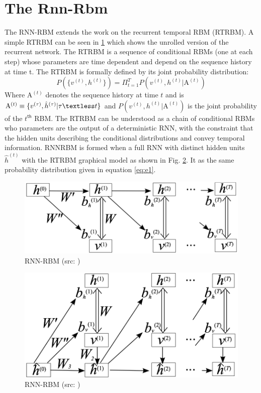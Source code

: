 \documentclass[letterpaper, 10 pt, conference]{ieeeconf}
\begin{document}
\section{The Rnn-Rbm}
The RNN-RBM\cite{c8} extends the work on the recurrent temporal RBM (RTRBM)\cite{c13}. A simple RTRBM can be seen in \ref{fig:rtrbm} which shows the unrolled version of the recurrent network. The RTRBM is a sequence of conditional RBMs (one at each step) whose parameters are time dependent and depend on the sequence history at time t. The RTRBM is formally defined by its joint probability distribution:
\begin{equation}
P(\{v^{(t)}, h^{(t)}\}) = \Pi_{t=1}^{T} P(v^{(t)}, h^{(t)} | \mathrm{A}^{(t)})
\label{eq:e1}
\end{equation}
Where $\mathrm{A}^{(t)}$ denotes the sequence history at time $t$ and is $\mathrm{A}^{(t)} \equiv \{ v^{(\tau)}, \hat{h}^{(\tau)} | \tau \textless t \}$ and $ P(v^{(t)}, h^{(t)} | \mathrm{A}^{(t)})$ is the joint probability of the $t^{\mathsf{th}}$ RBM. The RTRBM can be understood as a chain of conditional RBMs who parameters are the output of a deterministic RNN, with the constraint that the hidden units describing the conditional distributions and convey temporal information. RNNRBM is formed when a full RNN with distinct hidden units $\hat{h}^{(t)}$ with the RTRBM graphical model as shown in Fig. \ref{fig:rnnrbm}. It as the same probability distribution given in equation \ref{eq:e1}.

\begin{figure}[thpb]
      \centering
      \includegraphics[scale=0.35]{rtrbm.png}
      \caption{RNN-RBM (src: \cite{c8})}
      \label{fig:rtrbm}
\end{figure}

\begin{figure}[thpb]
      \centering
      \includegraphics[scale=0.35]{rnnrbm.png}
      \caption{RNN-RBM (src: \cite{c8})}
      \label{fig:rnnrbm}
\end{figure}
\end{document}
